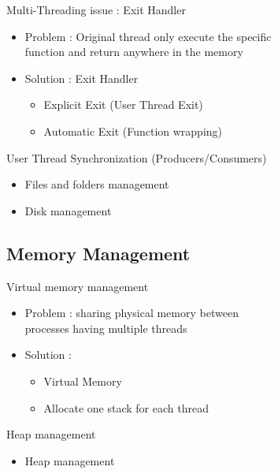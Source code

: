 \documentclass{beamer}
\begin{document}
\begin{frame}{Multi-Threading issue : Exit Handler}
  \begin{itemize}
    \item Problem : Original thread only execute the specific 
    \\function and return anywhere in the memory 
    \item Solution : Exit Handler
    \begin{itemize}
		\item Explicit Exit (User Thread Exit)
		\item Automatic Exit (Function wrapping)
    \end{itemize}
  \end{itemize}
\end{frame}

\begin{frame}{User Thread Synchronization (Producers/Consumers)}
  \begin{itemize}
    \item Files and folders management
    \item Disk management
  \end{itemize}
\end{frame}

\subsection{Memory Management}
\begin{frame}{Virtual memory management}
    \begin{itemize}
        \item Problem : sharing physical memory between 
            \\processes having multiple threads
        \item Solution  :
            \begin{itemize}
                \item Virtual Memory 
                \item Allocate one stack for each thread
            \end{itemize}
    \end{itemize}
\end{frame}

\begin{frame}{Heap management}
  \begin{itemize}
    \item Heap management
  \end{itemize}
\end{frame}
\end{document}
